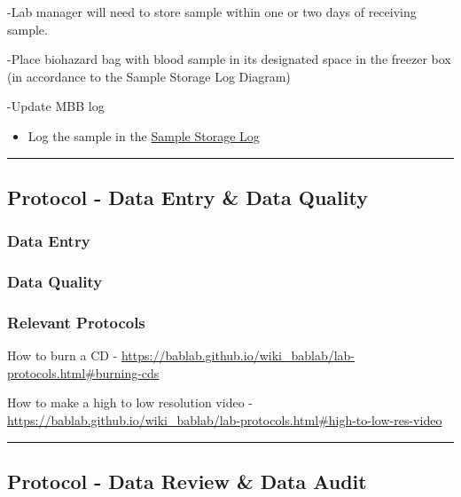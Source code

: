 \documentclass[]{book}
\providecommand{\tightlist}{%
  \setlength{\itemsep}{0pt}\setlength{\parskip}{0pt}}
\begin{document}
-Lab manager will need to store sample within one or two days of receiving sample.

-Place biohazard bag with blood sample in its designated space in the freezer box (in accordance to the Sample Storage Log Diagram)

-Update MBB log

\begin{itemize}
\tightlist
\item
  Log the sample in the \href{https://app.box.com/file/630322897864}{Sample Storage Log}
\end{itemize}

\begin{center}\rule{0.5\linewidth}{0.5pt}\end{center}

\hypertarget{protocol---data-entry-data-quality-2}{%
\subsection{Protocol - Data Entry \& Data Quality}\label{protocol---data-entry-data-quality-2}}

\hypertarget{data-entry-9}{%
\subsubsection{Data Entry}\label{data-entry-9}}

\hypertarget{data-quality-6}{%
\subsubsection{Data Quality}\label{data-quality-6}}

\hypertarget{relevant-protocols-2}{%
\subsubsection{Relevant Protocols}\label{relevant-protocols-2}}

How to burn a CD - \url{https://bablab.github.io/wiki_bablab/lab-protocols.html\#burning-cds}

How to make a high to low resolution video - \url{https://bablab.github.io/wiki_bablab/lab-protocols.html\#high-to-low-res-video}

\begin{center}\rule{0.5\linewidth}{0.5pt}\end{center}

\hypertarget{protocol---data-review-data-audit-2}{%
\subsection{Protocol - Data Review \& Data Audit}\label{protocol---data-review-data-audit-2}}
\end{document}
